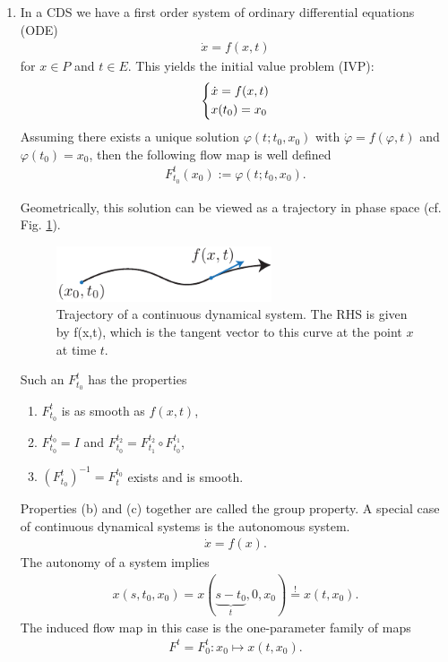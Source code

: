 \begin{enumerate}
\item In a CDS we have a first order system of ordinary differential equations (ODE)
	\begin{align}
		\boxed{
			\dot{ {x}} = f( {x},t)
		}
	\end{align}
	for $ {x}\in P$ and $t \in E$. This yields the initial value problem (IVP):
	\begin{align}
		\begin{dcases}
			\dot{ {x}} = f( {x},t) \\
			 {x}(t_0) =  {x}_0
		\end{dcases}
	\end{align}
	Assuming there exists a unique solution $\varphi(t; t_0,  {x}_0)$ with $\dot{\varphi} = f(\varphi,t)$ and $\varphi(t_0)=  {x}_0$, then the following flow map is well defined
	\begin{align}
		\boxed{
		F_{t_0}^{t}( {x}_0) := \varphi(t; t_0,  {x}_0).}
	\end{align}

Geometrically, this solution can be viewed as a trajectory in phase space (cf. Fig. \ref{fig:cds_traj}).
	\begin{figure}[h!]
	\centering
	\includegraphics[width = 0.6\textwidth]{figures/intro/2CDS.pdf}
	\caption{Trajectory of a continuous dynamical system. The RHS is given by f(x,t), which is the tangent vector to this curve at the point $x$ at time $t$.} \label{fig:cds_traj}
	\end{figure}
	
	Such an $F_{t_0}^{t}$ has the properties
	\begin{enumerate}
		\item $F_{t_0}^{t}$ is as smooth as $f( {x},t)$,
		\item $F_{t_0}^{t_0} = I$ and $F_{t_0}^{t_2} = F_{t_1}^{t_2} \circ F_{t_0}^{t_1}$,
		\item $\left(F_{t_0}^{t}\right)^{-1} = F_{t}^{t_0}$ exists and is smooth.
\end{enumerate}
Properties (b) and (c) together are called the group property. A special case of continuous dynamical systems is the autonomous system.
\begin{align}
	\boxed{\dot{ {x}} = f( {x}).}	
\end{align}
The autonomy of a system implies
\begin{align}
	 {x}(s,t_0,  {x}_0) =  {x}(\underbrace{s-t_0}_{t}, 0,  {x}_0) \stackrel{!}{=}  {x}(t, {x}_0).
\end{align}
The induced flow map in this case is the one-parameter family of maps
\begin{align}
	\boxed{ F^{t} = F_{0}^{t}:  {x}_0 \mapsto  {x}(t, {x}_0).}
\end{align}

\end{enumerate}
